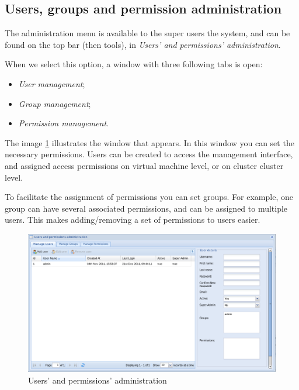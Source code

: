 \subsection{Users, groups and permission administration}
The administration menu is available to the super users the system, and can be found on the top bar (then tools), in \textit{Users' and permissions' administration}.

When we select this option, a window with three following tabs is open:
\begin{itemize}
	\item \textit{User management};
	\item \textit{Group management};
	\item \textit{Permission management}.
\end{itemize}

The image \ref{fig:user_admin} illustrates the window that appears. In this window you can set the necessary permissions. Users can be created to access the management interface, and assigned access permissions on virtual machine level, or on cluster cluster level.

To facilitate the assignment of permissions you can set groups. For example, one group can have several associated permissions, and can be assigned to multiple users. This makes adding/removing a set of permissions to users easier.


\begin{figure}[H]
        \begin{center}
        \includegraphics[scale=0.4]{screenshots/permissions/user.png}
        \caption{Users' and permissions' administration}
        \label{fig:user_admin}
        \end{center}
\end{figure}

